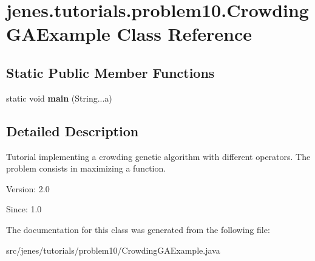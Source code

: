 \hypertarget{classjenes_1_1tutorials_1_1problem10_1_1_crowding_g_a_example}{
\section{jenes.tutorials.problem10.CrowdingGAExample Class Reference}
\label{classjenes_1_1tutorials_1_1problem10_1_1_crowding_g_a_example}
}
\subsection*{Static Public Member Functions}
\begin{CompactItemize}
\item 
\hypertarget{classjenes_1_1tutorials_1_1problem10_1_1_crowding_g_a_example_847763f724496b95a266a6fe2b54c3d7}{
static void \textbf{main} (String...a)}
\label{classjenes_1_1tutorials_1_1problem10_1_1_crowding_g_a_example_847763f724496b95a266a6fe2b54c3d7}

\end{CompactItemize}


\subsection{Detailed Description}
Tutorial implementing a crowding genetic algorithm with different operators. The problem consists in maximizing a function.

\begin{Desc}
\item[Version:]2.0 \end{Desc}
\begin{Desc}
\item[Since:]1.0 \end{Desc}


The documentation for this class was generated from the following file:\begin{CompactItemize}
\item 
src/jenes/tutorials/problem10/CrowdingGAExample.java\end{CompactItemize}
